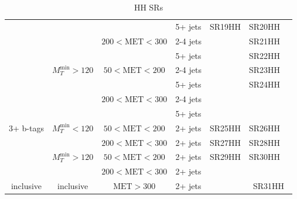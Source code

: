 \documentclass[plain,landscape]{article}
\begin{document}
\begin{table}
\begin{tabular}{|c|c|c|c|c|c|c|}
\cline{4-6}
& & & 5+ jets & \multirow{7}{*}{SR19HH} & SR20HH &  \\
\cline{3-4} \cline{6-6}
& &  \multirow{2}{*}{ $200 <  \textrm{MET} < 300$} &  2-4 jets & & SR21HH & \\
\cline{4-4}  \cline{6-6}
& & & 5+ jets & & SR22HH & \\
\cline{2-4} \cline{6-6}
& \multirow{4}{*}{$M_T^{\textrm{min}} > 120$}  & \multirow{2}{*}{ $50 < \textrm{MET} < 200$} & 2-4 jets & &  SR23HH & \\
\cline{4-4} \cline{6-6}
& & & 5+ jets & & \multirow{3}{*}{SR24HH} &  \\
\cline{3-4}
& &  \multirow{2}{*}{ $200 <  \textrm{MET} < 300$} &  2-4 jets & &  & \\
\cline{4-4} 
& & & 5+ jets & &  & \\
\cline{1-6}
\multirow{4}{*}{3+ b-tags} & \multirow{2}{*}{$M_T^{\textrm{min}} < 120$}  & $50 < \textrm{MET} < 200$ & 2+ jets & SR25HH & SR26HH & \\
\cline{3-6} 
& & $200 < \textrm{MET} < 300$ & 2+ jets & SR27HH & SR28HH & \\
\cline{2-6}
&  \multirow{2}{*}{$M_T^{\textrm{min}} > 120$}  & $50 < \textrm{MET} < 200$ & 2+ jets & \multirow{2}{*}{SR29HH} & \multirow{2}{*}{SR30HH} & \\
\cline{3-4} 
& & $200 < \textrm{MET} < 300$ & 2+ jets &  & &  \\
\hline
inclusive & inclusive & $\textrm{MET} > 300$ & 2+ jets & \cellcolor{black} & \multicolumn{2}{|c|}{SR31HH}  \\
\hline
\end{tabular}
\caption{HH SRs}
\end{table}
\end{document}
